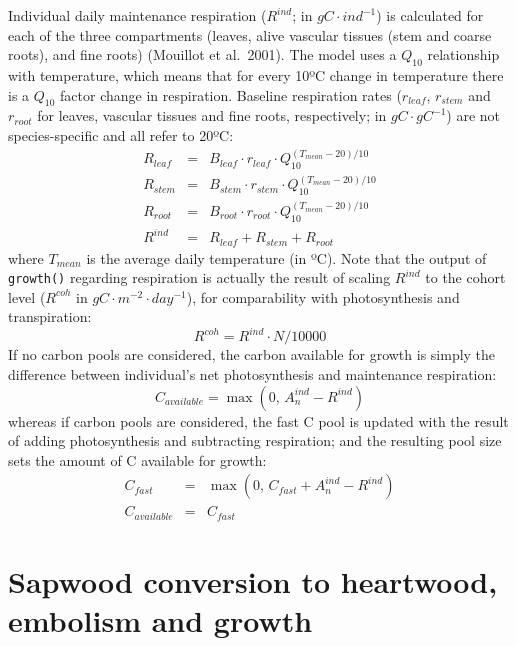 \documentclass[]{book}
\begin{document}
Individual daily maintenance respiration (\(R^{ind}\); in \(g C·ind^{-1}\)) is calculated for each of the three compartments (leaves, alive vascular tissues (stem and coarse roots), and fine roots) (Mouillot et al.~2001). The model uses a \(Q_{10}\) relationship with temperature, which means that for every 10ºC change in temperature there is a \(Q_{10}\) factor change in respiration. Baseline respiration rates (\(r_{leaf}\), \(r_{stem}\) and \(r_{root}\) for leaves, vascular tissues and fine roots, respectively; in \(gC·gC^{-1}\)) are not species-specific and all refer to 20ºC:
\begin{eqnarray}
R_{leaf} &=& B_{leaf} \cdot r_{leaf} \cdot Q_{10}^{(T_{mean}-20)/10} \\
R_{stem} &=& B_{stem} \cdot r_{stem} \cdot Q_{10}^{(T_{mean}-20)/10} \\
R_{root} &=& B_{root} \cdot r_{root} \cdot Q_{10}^{(T_{mean}-20)/10} \\
R^{ind} &=& R_{leaf}+R_{stem}+R_{root}
\end{eqnarray}
where \(T_{mean}\) is the average daily temperature (in ºC). Note that the output of \texttt{growth()} regarding respiration is actually the result of scaling \(R^{ind}\) to the cohort level (\(R^{coh}\) in \(g C · m^{-2} · day^{-1}\)), for comparability with photosynthesis and transpiration:
\begin{equation}
R^{coh} =  R^{ind} \cdot N / 10000
\end{equation}
If no carbon pools are considered, the carbon available for growth is simply the difference between individual's net photosynthesis and maintenance respiration:
\begin{equation}
C_{available} = \max(0,\, A_n^{ind} -  R^{ind})
\end{equation}
whereas if carbon pools are considered, the fast C pool is updated with the result of adding photosynthesis and subtracting respiration; and the resulting pool size sets the amount of C available for growth:
\begin{eqnarray}
C_{fast} &=& \max(0,\,C_{fast} + A_n^{ind} -  R^{ind})\\
C_{available} &=& C_{fast}
\end{eqnarray}

\hypertarget{sapwood-conversion-to-heartwood-embolism-and-growth}{%
\chapter{Sapwood conversion to heartwood, embolism and growth}\label{sapwood-conversion-to-heartwood-embolism-and-growth}}
\end{document}
